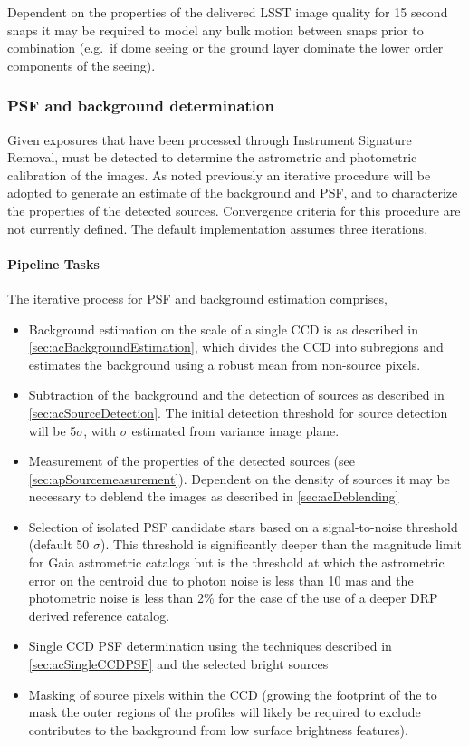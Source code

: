 Dependent on the properties of the delivered LSST image quality for 15 second snaps it may be required to model any bulk motion between snaps prior to combination (e.g.\ if dome seeing or the ground layer dominate the lower order components of the seeing).

\subsubsection{PSF and background determination}
\label{sec:apPSFBackground}

Given exposures that have been processed through Instrument Signature Removal, \Sources must be detected to determine the astrometric and photometric calibration of the images. As noted previously an iterative procedure will be adopted to generate an estimate of the background and PSF, and to characterize the properties of the detected sources.  Convergence criteria for this procedure are not currently defined. The default implementation assumes three iterations.

\paragraph{Pipeline Tasks}

The iterative process for PSF and background estimation comprises,
\begin{itemize}
\item Background estimation on the scale of a single CCD is as described in \ref{sec:acBackgroundEstimation}, which divides the CCD into subregions and estimates the background using a robust mean from non-source pixels.
\item Subtraction of the background and the detection of sources as described in \ref{sec:acSourceDetection}. The initial detection threshold for source detection will be 5$\sigma$, with $\sigma$ estimated from variance image plane.
\item Measurement of the properties of the detected sources (see \ref{sec:apSourcemeasurement}). Dependent on the density of sources it may be necessary to deblend the images as described in \ref{sec:acDeblending}
\item Selection of isolated PSF candidate stars based on a signal-to-noise threshold (default 50 $\sigma$). This threshold is significantly deeper than the magnitude limit for Gaia astrometric catalogs but is the threshold at which the astrometric error on the centroid due to photon noise is less than 10 mas and the photometric noise is less than 2\% for the case of the use of a deeper DRP derived reference catalog.
\item Single CCD PSF determination using the techniques described in \ref{sec:acSingleCCDPSF} and the selected bright sources
\item Masking of source pixels within the CCD (growing the footprint of the \Sources to mask the outer regions of the \Source profiles will likely be required to exclude contributes to the background from low surface brightness features).
\end{itemize}

